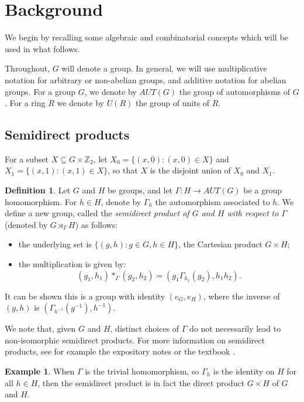 \documentclass[12pt, a4paper]{article}
\theoremstyle{definition}
\newtheorem{example}[theorem]{Example}
\newtheorem{definition}[theorem]{Definition}
\begin{document}
\section{Background}
We begin by recalling some algebraic and combinatorial concepts which will be used in what follows.  

Throughout, $G$ will denote a group. In general, we will use multiplicative notation for arbitrary or non-abelian groups, and additive notation for abelian groups. For a group $G$, we denote by $AUT(G)$ the group of automorphisms of $G$.  For a ring $R$ we denote by $U(R)$ the group of units of $R$.   


\subsection{Semidirect products}

For a subset $X \subseteq G \times \mathbb{Z}_2$, let $X_0=\{(x,0): (x,0) \in X\}$ and $X_1=\{(x,1): (x,1) \in X\}$, so that $X$ is the disjoint union of $X_0$ and $X_1$. 
\begin{definition}
Let $G$ and $H$ be groups, and let $\Gamma: H \rightarrow AUT(G)$ be a group homomorphism. For $h \in H$, denote by $\Gamma_h$ the automorphism associated to $h$. We define a new group, called the \textit{semidirect product of $G$ and $H$ with respect to $\Gamma$} (denoted by $G \rtimes_\Gamma H$) as follows:
\begin{itemize}
\item the underlying set is $\{(g,h): g \in G, h \in H\}$, the Cartesian product $G \times H$;
\item the multiplication is given by:
\[(g_1,h_1)*_{\Gamma}(g_2,h_2) = (g_1 \Gamma_{h_1}(g_2),h_1 h_2).\]
\end{itemize}
It can be shown this is a group with identity $(e_G,e_H)$, where the inverse of $(g,h)$ is $(\Gamma_{h^{-1}}(g^{-1}), h^{-1})$.
\end{definition}
We note that, given $G$ and $H$, distinct choices of $\Gamma$ do not necessarily lead to non-isomorphic semidirect products.  For more information on semidirect products, see for example the expository notes \cite{Con} or the textbook \cite{Isa}. 

\begin{example}
When $\Gamma$ is the trivial homomorphism, so $\Gamma_h$ is the identity on $H$ for all $h \in H$, then the semidirect product is in fact the direct product $G \times H$ of $G$ and $H$. 
\end{example}
\end{document}
